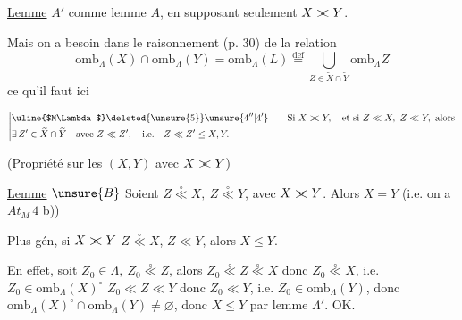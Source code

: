 
\uline{Lemme} $A'$ comme lemme $A$, en supposant seulement $X\mathrel{\rlap{$>$}<} Y$.

Mais on a besoin dans le raisonnement (p. 30) de la relation
\[
\mathrm{omb}_{\Lambda}(X)\cap \mathrm{omb}_{\Lambda}(Y)=\mathrm{omb}_{\Lambda}(L)\overset{\mathrm{def}}{=}\bigcup_{Z\in\widetilde X\cap\widetilde Y}\mathrm{omb}_{\Lambda}Z
\]
ce qu'il faut  ici  

\[
\left|\begin{aligned}
&\text{\uline{$M\Lambda$}\deleted{\unsure{5}}$\unsure{4''|4'}$}\qquad\text{Si }X\mathrel{\rlap{$>$}<} Y,\quad\text{et si }Z\ll X,\ Z\ll Y,\ \text{alors}\\
&\exists\,Z'\in\widetilde X\cap\widetilde Y\quad\text{avec }Z\ll Z',\quad\text{i.e.}\quad Z\ll Z'\leq X,Y .
\end{aligned}\right.
\]

(Propriété  sur les  $(X,Y)$ avec $X\mathrel{\rlap{$>$}<} Y$)

\uline{Lemme} $\unsure{B}$ Soient $Z\overset{\circ}{\ll} X,\ Z\overset{\circ}{\ll} Y$, avec $X\mathrel{\rlap{$>$}<} Y$. Alors $X=Y$ (i.e. on a $A\!t_{M}\,4$ b))

 Plus gén, si  $X\mathrel{\rlap{$>$}<} Y$  $Z\overset{\circ}{\ll} X$,  $Z\ll Y$, alors $X\leq Y$.



En effet, soit $Z_0\in\Lambda,\ Z_0\overset{\circ}{\ll} Z$, alors $Z_0\overset{\circ}{\ll} Z\overset{\circ}{\ll} X$ donc $Z_0\overset{\circ}{\ll} X$,  i.e. $Z_0\in \mathrm{omb}_{\Lambda}(X)^\circ$ $Z_0\ll Z\ll Y$ donc $Z_0\ll Y$, i.e. $Z_0\in \mathrm{omb}_{\Lambda}(Y)$, donc $\mathrm{omb}_{\Lambda}(X)^\circ\cap \mathrm{omb}_{\Lambda}(Y)\ne\varnothing$, donc $X\leq Y$ par lemme $\Lambda'$. OK.
